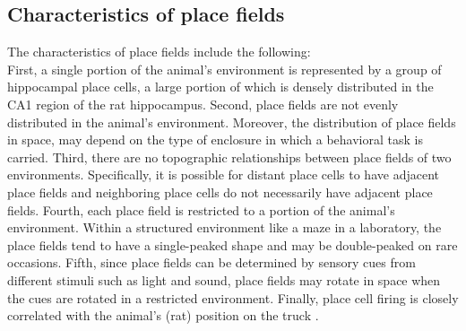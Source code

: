 \subsection{Characteristics of place fields}
The characteristics of place fields \cite{OKeefe1978,Burgess1994} include the following:\\
First, a single portion of the animal's environment is represented by a group
of hippocampal place cells, a large portion of which is densely distributed
in the CA1 region of the rat hippocampus.
Second, place fields are not evenly distributed in the animal's environment.
Moreover, the distribution of place fields in space, may depend on the type
of enclosure in which a behavioral task is carried.
Third, there are no topographic relationships between place fields of two environments. Specifically, it is possible for distant place cells to have adjacent place fields and neighboring place cells do not necessarily have adjacent place fields.
Fourth, each place field is restricted to a portion of the animal's environment.
Within a structured environment like a maze in a laboratory, the place fields
tend to have a single-peaked shape and may be double-peaked on rare  occasions.
Fifth, since place fields can be determined by sensory cues from different
stimuli such as light and sound, place fields may rotate in space when the cues are rotated in a restricted environment.
Finally, place cell firing is closely correlated with the animal's (rat) position
on the truck \cite{1993Doth}.

\newpage


















































